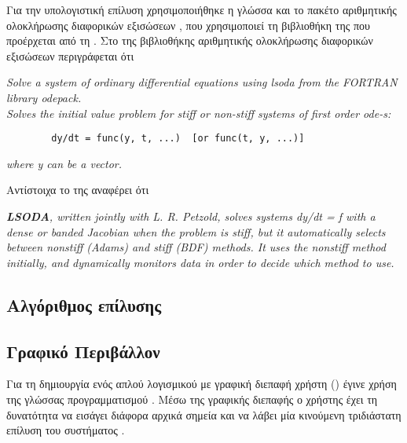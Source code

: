 Για την υπολογιστική επίλυση χρησιμοποιήθηκε η γλώσσα \textit{} και το πακέτο αριθμητικής ολοκλήρωσης διαφορικών εξισώσεων \textit{}, που χρησιμοποιεί τη βιβλιοθήκη της \textit{} που προέρχεται από τη \textit{}. Στο  της βιβλιοθήκης αριθμητικής ολοκλήρωσης διαφορικών εξισώσεων \textit{} περιγράφεται ότι
\begin{displayquote}
    \textit{Solve a system of ordinary differential equations using lsoda from the FORTRAN library odepack.}  \\
    \textit{Solves the initial value problem for stiff or non-stiff systems of first order ode-s:}
    \begin{verbatim}
        dy/dt = func(y, t, ...)  [or func(t, y, ...)]
    \end{verbatim}
    \textit{where y can be a vector.}
\end{displayquote}

Αντίστοιχα το  της  αναφέρει ότι
\begin{displayquote}
    \textit{\textbf{LSODA}, written jointly with L. R. Petzold, solves systems dy/dt = f with a dense or banded Jacobian when the problem is stiff, but it automatically selects between nonstiff (Adams) and stiff (BDF) methods. It uses the nonstiff method initially, and dynamically monitors data in order to decide which method to use.}
\end{displayquote}

\subsection{Αλγόριθμος επίλυσης}
\lstset{style=nonums}


\subsection{Γραφικό Περιβάλλον}
Για τη δημιουργία ενός απλού λογισμικού με γραφική διεπαφή χρήστη () έγινε χρήση της γλώσσας προγραμματισμού . Μέσω της γραφικής διεπαφής ο χρήστης έχει τη δυνατότητα να εισάγει διάφορα αρχικά σημεία και να λάβει μία κινούμενη τριδιάστατη επίλυση του συστήματος .
